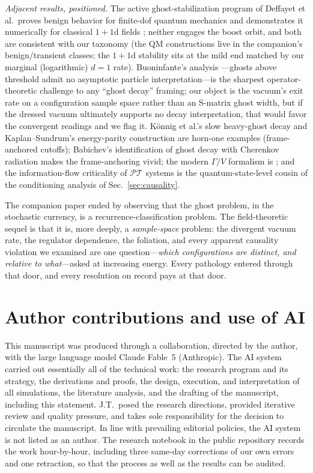 \documentclass[11pt]{article}
\theoremstyle{definition}
\theoremstyle{remark}
\newcommand{\PT}{\mathcal{PT}}
\begin{document}
\emph{Adjacent results, positioned.} The active
ghost-stabilization program of Deffayet et al.\ proves benign
behavior for finite-dof quantum mechanics \cite{Deffayet2026} and
demonstrates it numerically for classical $1{+}1$d fields \cite{Deffayet2504}; neither engages the
boost orbit, and both are consistent with our taxonomy (the QM
constructions live in the companion's benign/transient classes; the
$1{+}1$d stability sits at the mild end matched by our marginal
(logarithmic) $d{=}1$ rate).
Buoninfante's analysis \cite{Buoninfante2026}---ghosts above
threshold admit no asymptotic particle interpretation---is the
sharpest operator-theoretic challenge to any ``ghost decay''
framing; our object is the vacuum's exit rate on a configuration
sample space rather than an S-matrix ghost width, but if the
dressed vacuum ultimately supports no decay interpretation, that
would favor the convergent readings and we flag it. K\"onnig et
al.'s slow heavy-ghost decay \cite{Konnig2016} and Kaplan--Sundrum's
energy-parity construction \cite{KaplanSundrum} are horn-one
examples (frame-anchored cutoffs); Babichev's identification of
ghost decay with Cherenkov radiation \cite{Babichev2024} makes the
frame-anchoring vivid; the modern $\Gamma/V$ formalism is
\cite{Andreassen2016}; and the information-flow criticality of
$\PT$ systems \cite{KAU2017} is the quantum-state-level cousin of
the conditioning analysis of Sec.~\ref{sec:causality}.

The companion paper ended by observing that the ghost problem, in the
stochastic currency, is a recurrence-classification problem. The
field-theoretic sequel is that it is, more deeply, a
\emph{sample-space} problem: the divergent vacuum rate, the
regulator dependence, the foliation, and every apparent causality
violation we examined are one question---\emph{which configurations
are distinct, and relative to what}---asked at increasing energy.
Every pathology entered through that door, and every resolution on
record pays at that door.

\section*{Author contributions and use of AI}

This manuscript was produced through a collaboration, directed by the
author, with the large language model Claude Fable~5 (Anthropic). The
AI system carried out essentially all of the technical work: the
research program and its strategy, the derivations and proofs, the
design, execution, and interpretation of all simulations, the
literature analysis, and the drafting of the manuscript, including
this statement. J.T.\ posed the research directions, provided
iterative review and quality pressure, and takes sole responsibility
for the decision to circulate the manuscript. In line with prevailing
editorial policies, the AI system is not listed as an author. The
research notebook in the public repository records the work
hour-by-hour, including three same-day corrections of our own errors
and one retraction, so that the process as well as the results can be
audited.
\end{document}
